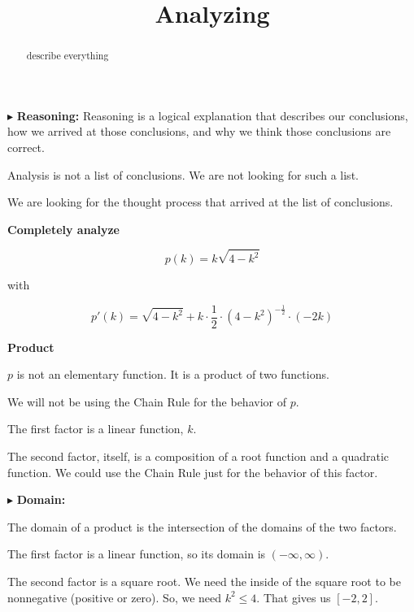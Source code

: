 \documentclass{ximera}
\title{Analyzing}
\begin{document}
\begin{abstract}
describe everything
\end{abstract}
\maketitle




$\blacktriangleright$ \textbf{\textcolor{red!70!black}{Reasoning:}} Reasoning is a logical explanation that describes our conclusions, how we arrived at those conclusions, and why we think those conclusions are correct. 

Analysis is not a list of conclusions. We are not looking for such a list. 

We are looking for the thought process that arrived at the list of conclusions. 





\textbf{\textcolor{purple!85!blue}{Completely analyze}}

\[
p(k) = k \sqrt{4-k^2}
\]


with


\[
p'(k) = \sqrt{4-k^2} + k \cdot \frac{1}{2} \cdot (4-k^2)^{-\tfrac{1}{2}} \cdot (-2k)
\]

\begin{remark} \textbf{\textcolor{yellow!35!black}{Product}}

$p$ is not an elementary function.  It is a product of two functions. 

We will not be using the Chain Rule for the behavior of $p$.



The first factor is a linear function, $k$. 

The second factor, itself, is a composition of a root function and a quadratic function. We could use the Chain Rule just for the behavior of this factor. 

\end{remark}




$\blacktriangleright$  \textbf{\textcolor{blue!55!black}{Domain:}} 

The domain of a product is the intersection of the domains of the two factors. 

The first factor is a linear function, so its domain is $(-\infty, \infty)$. 

The second factor is a square root. We need the inside of the square root to be nonnegative (positive or zero).  So, we need $k^2 \leq 4$. That gives us $[-2, 2]$. 
\end{document}
